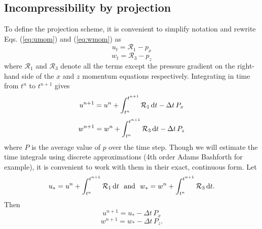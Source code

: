 \documentclass{jfm-like}
\begin{document}
\subsection{Incompressibility by projection}
To define the projection scheme, it is convenient to simplify notation and rewrite Eqs. (\ref{eq:umom}) and (\ref{eq:wmom}) as
\begin{equation}
u_t = {\mathcal R}_1 - p_x
\label{eq:umom2}
\end{equation}
\begin{equation}
w_t =   {\mathcal R}_3 - p_z
\label{eq:wmom2}
\end{equation}
where ${\mathcal R}_1$  and ${\mathcal R}_3$ denote all the terms except the pressure gradient on the right-hand side of the $x$ and $z$ momentum equations respectively. 
Integrating in time from $t^n$ to $t^{n+1}$ gives
\begin{equation}
u^{n+1} = u^{n}  + \int_{t^n}^{t^{n+1}}  {\mathcal R}_1  \,{\rm d}t  - \Delta t \, P_x
\label{eq:umom3}
\end{equation}
\begin{equation}
w^{n+1} = w^{n}  + \int_{t^n}^{t^{n+1}}  {\mathcal R}_3 \, {\rm d}t  - \Delta t \, P_z
\label{eq:wmom3}
\end{equation}
where $P$ is the average value of $p$ over the time step. Though we will estimate the time integrals using discrete approximations (4th order Adams Bashforth for example), 
it is convenient to work with them in their exact, continuous form.
Let
\begin{equation}
u_* = u^{n}  + \int_{t^n}^{t^{n+1}}  {\mathcal R}_1  \,{\rm d}t  ~~{\rm and}~~ w_* = w^{n}  + \int_{t^n}^{t^{n+1}}  {\mathcal R}_3  \,{\rm d}t.
\label{eq:ustardefs}
\end{equation}
Then
\begin{equation}
u^{n+1} = u_* - \Delta t \, P_x
\label{eq:umom4}
\end{equation}
\begin{equation}
w^{n+1} = w_* - \Delta t \, P_z.
\label{eq:wmom4}
\end{equation}
\end{document}
